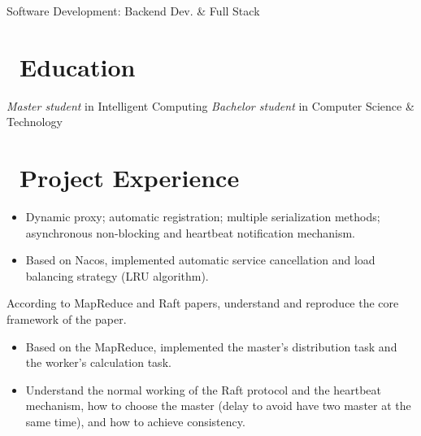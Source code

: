 \documentclass{resume}
\begin{document}


\centerline{Software Development: Backend Dev. \& Full Stack}
\vspace{2ex}

 
\section{\faGraduationCap\ Education}
\textit{Master student} in Intelligent Computing 
\textit{Bachelor student} in Computer Science \& Technology

\section{\faUsers\ Project Experience}
\begin{itemize}
  \item Dynamic proxy; automatic registration; multiple serialization methods; asynchronous non-blocking and heartbeat notification mechanism.
  \item Based on Nacos, implemented automatic service cancellation and load balancing strategy (LRU algorithm).
\end{itemize}

According to MapReduce and Raft papers, understand and reproduce the core framework of the paper.
\begin{itemize}
  \item Based on the MapReduce, implemented the master's distribution task and the worker's calculation task.
  \item Understand the normal working of the Raft protocol and the heartbeat mechanism, how to choose the master (delay to avoid have two master at the same time), and how to achieve consistency.
\end{itemize}
\end{document}

